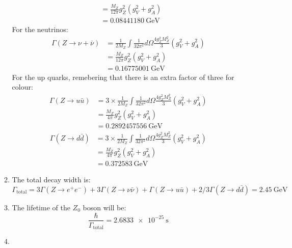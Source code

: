 \documentclass[12pt,a4]{article}
\begin{document}
\begin{enumerate}
\begin{enumerate}
\begin{align*}
                                &= \frac{M_Z}{12 \pi } g_Z^2 (g_V^2 + g_A^2) \\
                                &= \SI{0.08441180}{\giga \eV}
        \end{align*}
        For the neutrinos:
        \begin{align*}
          \Gamma(Z \to \nu+ \bar{\nu}) 
                                &= \frac{1}{2 M_Z}\int \frac{1}{32 \pi^2} d\Omega \frac{4 g_Z^2 M_Z^2}{3} (g_V^2 + g_A^2) \\
                                &= \frac{M_Z}{12 \pi } g_Z^2 (g_V^2 + g_A^2) \\
                                &= \SI{0.16775001}{\giga \eV}
        \end{align*}
        For the up quarks, remebering that there is an extra factor of three for colour:
        \begin{align*}
          \Gamma(Z \to u \bar{u}) 
                                &= 3 \times \frac{1}{2 M_Z}\int \frac{1}{32 \pi^2} d\Omega \frac{4 g_Z^2 M_Z^2}{3} (g_V^2 + g_A^2) \\
                                &= \frac{M_Z}{4 \pi } g_Z^2 (g_V^2 + g_A^2) \\
                                &= \SI{0.2892457556}{\giga \eV}
        \end{align*}
        \begin{align*}
          \Gamma(Z \to d \bar{d}) 
                                &= 3 \times \frac{1}{2 M_Z}\int \frac{1}{32 \pi^2} d\Omega \frac{4 g_Z^2 M_Z^2}{3} (g_V^2 + g_A^2) \\
                                &= \frac{M_Z}{4 \pi } g_Z^2 (g_V^2 + g_A^2) \\
                                &= \SI{0.372583}{\giga \eV}
        \end{align*}
      \item
        The total decay width is:
        \begin{equation*}
          \Gamma_\text{total} = 3 \Gamma(Z \to e^+ e^-) + 3 \Gamma(Z \to \nu \bar{\nu}) + \Gamma(Z \to u \bar{u}) + 2 / 3 \Gamma(Z \to d \bar{d}) = \SI{2.45}{\giga \eV}
        \end{equation*}
      \item
        The lifetime of the $Z_0$ boson will be:
        \begin{equation*}
          \frac{\hbar}{\Gamma_{\text{total}}} = \SI{2.6833e-25}{\second}
        \end{equation*}
      \item

\end{enumerate}
\end{enumerate}
\end{document}
